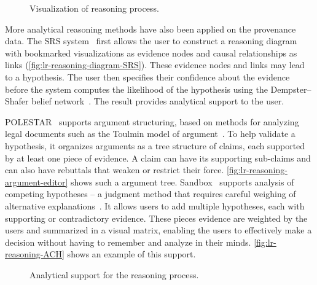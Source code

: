 \begin{figure}[!htb]
\centering
{}
\hfill
{}
\caption{Visualization of reasoning process.}
\end{figure}

More analytical reasoning methods have also been applied on the provenance data. The SRS system~\cite{Pike2009} first allows the user to construct a reasoning diagram with bookmarked visualizations as evidence nodes and causal relationships as links (\autoref{fig:lr-reasoning-diagram-SRS}). These evidence nodes and links may lead to a hypothesis. The user then specifies their confidence about the evidence before the system computes the likelihood of the hypothesis using the Dempster–Shafer belief network~\cite{Sanfilippo2007}. The result provides analytical support to the user. 

POLESTAR~\cite{Pioch2006} supports argument structuring, based on methods for analyzing legal documents such as the Toulmin model of argument~\cite{Toulmin2003}. To help validate a hypothesis, it organizes arguments as a tree structure of claims, each supported by at least one piece of evidence. A claim can have its supporting sub-claims and can also have rebuttals that weaken or restrict their force. \autoref{fig:lr-reasoning-argument-editor} shows such a argument tree. Sandbox~\cite{Wright2006} supports analysis of competing hypotheses -- a judgment method that requires careful weighing of alternative explanations~\cite{Heuer1999}. It allows users to add multiple hypotheses, each with supporting or contradictory evidence. These pieces evidence are weighted by the users and summarized in a visual matrix, enabling the users to effectively make a decision without having to remember and analyze in their minds. \autoref{fig:lr-reasoning-ACH} shows an example of this support.

\begin{figure}[!htb]
\centering
{}
\hfill
{}
\caption{Analytical support for the reasoning process.}
\label{fig:lr-reasoning}
\end{figure}

